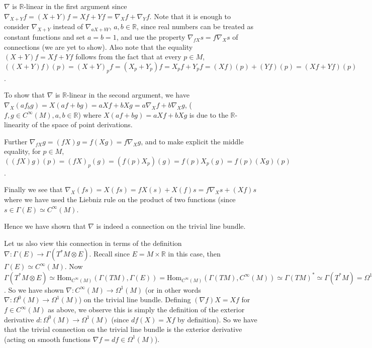 \documentclass[a4paper]{article}
\theoremstyle{definition} \newtheorem*{definition}{Definition}
\theoremstyle{definition} \newtheorem*{definitions}{Definitions}
\theoremstyle{plain} \newtheorem{theorem}{Theorem}[section]
\theoremstyle{plain} \newtheorem{proposition}[theorem]{Proposition}
\theoremstyle{plain} \newtheorem{corollary}[theorem]{Corollary}
\theoremstyle{plain} \newtheorem{lemma}[theorem]{Lemma}
\theoremstyle{plain} \newtheorem{example}[theorem]{Example}
\newcommand{\realnos}{\mathbb{R}}
\newcommand{\Hom}{\text{Hom}}
\newcommand{\smooth}{C^\infty}
\begin{document}
$\nabla$ is $\realnos$-linear in the first argument since $\nabla_{X+Y}f=(X+Y)f=Xf+Yf=\nabla_Xf + \nabla_Yf$. Note that it is enough to consider $\nabla_{X+Y}$ instead of $\nabla_{aX+bY}$, $a,b\in \realnos$, since real numbers can be treated as constant functions and set $a=b=1$, and use the property $\nabla_{fX}s=f\nabla_X s$ of connections (we are yet to show). Also note that the equality $(X+Y)f=Xf+Yf$ follows from the fact that at every $p\in M$,
$((X+Y)f)(p)=(X+Y)_pf=(X_p+Y_p)f=X_pf+Y_pf=(Xf)(p)+(Yf)(p)=(Xf+Yf)(p)$.

To show that $\nabla$ is $\realnos$-linear in the second argument, we have $\nabla_X(af_bg)=X(af+bg)=aXf+bXg=a\nabla_Xf + b\nabla_X g$, ($f, g \in \smooth (M), a,b\in \realnos$) where $X(af+bg)=aXf+bXg$ is due to the $\realnos$-linearity of the space of point derivations. 

Further $\nabla_{fX}g=(fX)g=f(Xg)=f\nabla_X g$, and to make explicit the middle equality, for $p\in M$, $((fX)g)(p)=(fX)_p(g)=(f(p)X_p)(g)=f(p)X_p(g)=f(p)(Xg)(p)$.

Finally we see that $\nabla_X(fs)=X(fs)=fX(s)+X(f)s=f\nabla_Xs + (Xf)s$ where we have used the Liebniz rule on the product of two functions (since $s\in \Gamma(E)\simeq \smooth(M)$.

Hence we have shown that $\nabla$ is indeed a connection on the trivial line bundle. 

Let us also view this connection in terms of the definition $\nabla:\Gamma(E)\to \Gamma(T^*M\otimes E)$. Recall since $E=M\times \realnos$ in this case, then $\Gamma(E)\simeq \smooth (M)$. Now $\Gamma(T^*M\otimes E)\simeq \Hom_{\smooth(M)}(\Gamma(TM), \Gamma(E)) = \Hom_{\smooth(M)}(\Gamma(TM), \smooth(M)) \simeq \Gamma(TM)^* \simeq \Gamma(T^*M)=\Omega^1(M)$. So we have shown $\nabla:\smooth(M)\to \Omega^1(M)$ (or in other words $\nabla:\Omega^0(M)\to \Omega^1(M)$) on the trivial line bundle. Defining $(\nabla f)X=Xf$ for $f\in \smooth(M)$ as above, we observe this is simply the definition of the exterior derivative $d:\Omega^0(M)\to \Omega^1(M)$ (since $df(X)=Xf$ by definition). So we have that the trivial connection on the trivial line bundle is the exterior derivative (acting on smooth functions $\nabla f=df \in \Omega^1(M)$). 
\end{document}
